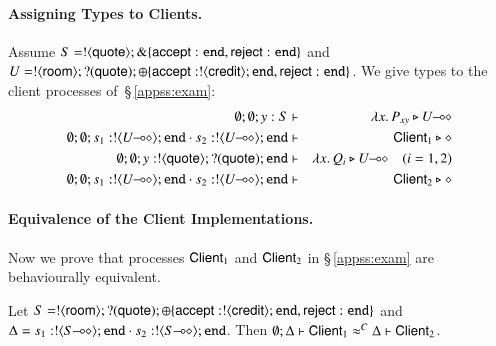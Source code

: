\paragraph{Assigning Types to Clients.}
Assume $S = ! \langle \mathsf{quote} \rangle ; \& \{\mathsf{accept}: \mathtt{end}, \mathsf{reject}: \mathtt{end}\}$ and
$U = ! \langle \mathsf{room} \rangle ; ? (\mathsf{quote}) ; \oplus \{\mathsf{accept}: ! \langle \mathsf{credit} \rangle ; \mathtt{end}, \mathsf{reject}: \mathtt{end} \}$.
We give types to the client processes of~\S\,\ref{appss:exam}:
\begin{eqnarray*}
\es; \es; y: S & \proves &  \abs{x}{P_{xy}} \hastype \lhot{U} \\
\es; \es; s_1: \btout{\lhot{U}} \tinact \cat s_2: \btout{\lhot{U}} \tinact & \proves &  \Client_1 \hastype \Proc \\
\es; \es; y: \btout{\Quote} \btinp{\Quote} \tinact & \proves &  \abs{x}{Q_i} \hastype \lhot{U} \quad (i=1,2)\\
\es; \es; s_1: \btout{\lhot{U}} \tinact \cat s_2: \btout{\lhot{U}} \tinact & \proves &  \Client_2 \hastype \Proc
\end{eqnarray*}


\paragraph{Equivalence of the Client Implementations.}
Now we prove 
that  processes 
$\mathsf{Client}_1$ and $\mathsf{Client}_2$ 
in \S\,\ref{appss:exam}
are behaviourally equivalent.

\begin{proposition}\label{p:examp}
	Let
	$S = ! \langle \mathsf{room} \rangle ; ? (\mathsf{quote}) ; \oplus \{\mathsf{accept}: ! \langle \mathsf{credit} \rangle ; \mathtt{end}, \mathsf{reject}: \mathtt{end}\}$ and 
$\Delta = s_1: \btout{\lhot{S}} \tinact \cat s_2: \btout{\lhot{S}} \tinact$. 
Then
	$ \emptyset; \Delta \vdash \mathsf{Client}_1 \approx^{C} \Delta \vdash \mathsf{Client}_2$. %
\end{proposition}

